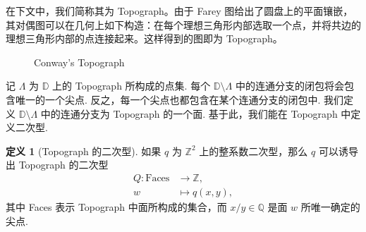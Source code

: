 \documentclass[10pt,UTF8]{ctexart}
\newcommand{\Z}{\mathbb{Z}}
\newcommand{\Q}{\mathbb{Q}}
\newcommand{\D}{\mathbb{D}}
\theoremstyle{definition}
\newtheorem{definition}[theorem]{定义}
\theoremstyle{remark}
\begin{document}
在下文中，我们简称其为 Topograph。由于 Farey 图给出了圆盘上的平面镶嵌，其对偶图可以在几何上如下构造：在每个理想三角形内部选取一个点，并将共边的理想三角形内部的点连接起来。这样得到的图即为 Topograph。





\begin{figure}[H]
    \centering
    \caption{Conway's Topograph}
    \label{fig:farey_disk}
\end{figure}

记 $\Lambda$ 为 $\D$ 上的 Topograph 所构成的点集. 每个 $\D\setminus \Lambda$ 中的连通分支的闭包将会包含唯一的一个尖点. 
反之，每一个尖点也都包含在某个连通分支的闭包中. 我们定义 $\D\setminus \Lambda$ 中的连通分支为 Topograph 的一个面. 
基于此，我们能在 Topograph 中定义二次型.
\begin{definition}[Topograph 的二次型]
    如果 $q$ 为 $\Z^2$ 上的整系数二次型，那么 $q$ 可以诱导出 Topograph 的二次型 
    \begin{align*}
        Q: \text{Faces} &\to \Z,\\
        w &\mapsto q(x,y),
    \end{align*}
    其中 Faces 表示 Topograph 中面所构成的集合，而 $x/y\in\Q$ 是面 $w$ 所唯一确定的尖点.  
\end{definition}
\end{document}
